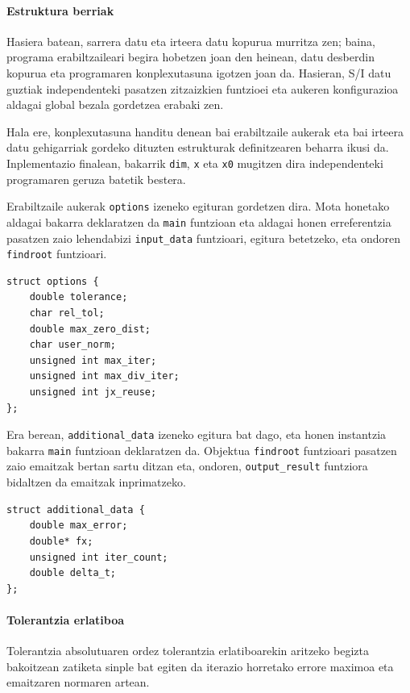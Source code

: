 \documentclass[10pt,a4paper,basque]{article}
\begin{document}
\paragraph{Estruktura berriak}

Hasiera batean, sarrera datu eta irteera datu kopurua murritza zen; baina, programa erabiltzaileari begira hobetzen joan den heinean, datu desberdin kopurua eta programaren konplexutasuna igotzen joan da. Hasieran, S/I datu guztiak independenteki pasatzen zitzaizkien funtzioei eta aukeren konfigurazioa aldagai global bezala gordetzea erabaki zen.

Hala ere, konplexutasuna handitu denean bai erabiltzaile aukerak eta bai irteera datu gehigarriak gordeko dituzten estrukturak definitzearen beharra ikusi da. Inplementazio finalean, bakarrik \verb|dim|, \verb|x| eta \verb|x0| mugitzen dira independenteki programaren geruza batetik bestera.

Erabiltzaile aukerak \verb|options| izeneko egituran gordetzen dira. Mota honetako aldagai bakarra deklaratzen da \verb|main| funtzioan eta aldagai honen erreferentzia pasatzen zaio lehendabizi \verb|input_data| funtzioari, egitura betetzeko, eta ondoren \verb|findroot| funtzioari.

\begin{lstlisting}
struct options {
	double tolerance;
	char rel_tol;
	double max_zero_dist;
	char user_norm;
	unsigned int max_iter;
	unsigned int max_div_iter;
	unsigned int jx_reuse;
};
\end{lstlisting}

Era berean, \verb|additional_data| izeneko egitura bat dago, eta honen instantzia bakarra \verb|main| funtzioan deklaratzen da. Objektua \verb|findroot| funtzioari pasatzen zaio emaitzak bertan sartu ditzan eta, ondoren, \verb|output_result| funtziora bidaltzen da emaitzak inprimatzeko.

\begin{lstlisting}
struct additional_data {
	double max_error;
	double* fx;
	unsigned int iter_count;
	double delta_t;
};
\end{lstlisting}

\paragraph{Tolerantzia erlatiboa}

Tolerantzia absolutuaren ordez tolerantzia erlatiboarekin aritzeko begizta bakoitzean zatiketa sinple bat egiten da iterazio horretako errore maximoa eta emaitzaren normaren artean.
\end{document}
